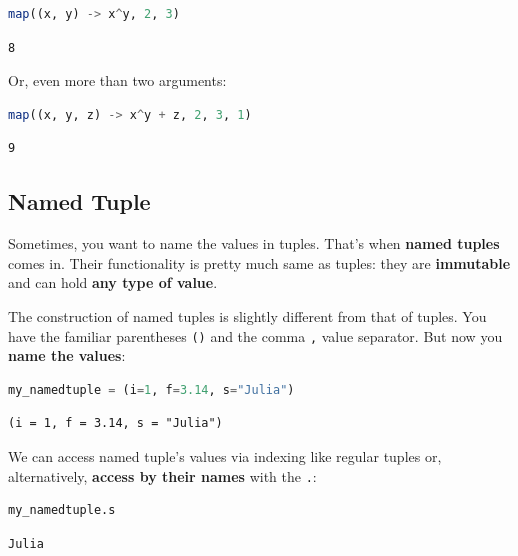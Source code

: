 \documentclass[
  notoc %
]{tufte-book}
\newcommand{\passthrough}[1]{#1}
\begin{document}
\begin{lstlisting}[language=Julia]
map((x, y) -> x^y, 2, 3)
\end{lstlisting}

\begin{lstlisting}[language=Output]
8
\end{lstlisting}

Or, even more than two arguments:

\begin{lstlisting}[language=Julia]
map((x, y, z) -> x^y + z, 2, 3, 1)
\end{lstlisting}

\begin{lstlisting}[language=Output]
9
\end{lstlisting}

\hypertarget{sec:namedtuple}{%
\subsection{Named Tuple}\label{sec:namedtuple}}

Sometimes, you want to name the values in tuples. That's when
\textbf{named tuples} comes in. Their functionality is pretty much same
as tuples: they are \textbf{immutable} and can hold \textbf{any type of
value}.

The construction of named tuples is slightly different from that of
tuples. You have the familiar parentheses \passthrough{\lstinline!()!}
and the comma \passthrough{\lstinline!,!} value separator. But now you
\textbf{name the values}:

\begin{lstlisting}[language=Julia]
my_namedtuple = (i=1, f=3.14, s="Julia")
\end{lstlisting}

\begin{lstlisting}[language=Output]
(i = 1, f = 3.14, s = "Julia")
\end{lstlisting}

We can access named tuple's values via indexing like regular tuples or,
alternatively, \textbf{access by their names} with the
\passthrough{\lstinline!.!}:

\begin{lstlisting}[language=Julia]
my_namedtuple.s
\end{lstlisting}

\begin{lstlisting}[language=Output]
Julia
\end{lstlisting}
\end{document}
